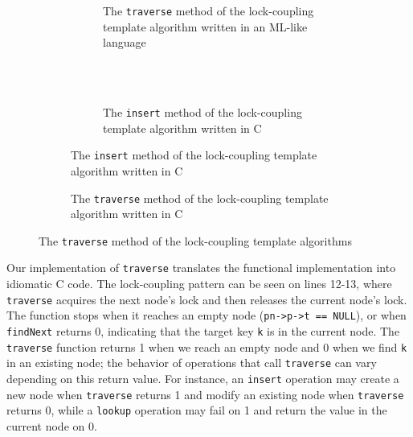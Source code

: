 \documentclass[a4paper,UKenglish,cleveref, autoref, thm-restate]{lipics-v2021}
\newcommand{\wm}[1]{\textbf{\textcolor{violet}{[William: #1]}}}
\begin{document}
\begin{figure}[h]
	\begin{subfigure}[t]{0.48\textwidth}
		\begin{subfigure}[t]{\textwidth}
			 
			\caption{The \lstinline{traverse} method of the lock-coupling template algorithm written in an ML-like language \cite{krishna2019compositional}} 
			\label{traverse_lock_a}	
		\end{subfigure}
		\\ \\ 
		\renewcommand{\thesubfigure}{c}%
		\begin{subfigure}[t]{\textwidth}
			 
			\caption{The \lstinline{insert} method of the lock-coupling template algorithm written in C}
			\label{insert_lock}	
		\end{subfigure}
	\end{subfigure}\qquad
	\renewcommand{\thesubfigure}{b}%
	\begin{subfigure}[t]{0.48\textwidth}
		 
		\caption{The \lstinline{traverse} method of the lock-coupling template algorithm written in C}
		\label{traverse_lock_b}
	\end{subfigure}
	\caption{The \lstinline{traverse} method of the lock-coupling template algorithms 
	}
	\label{traverse_lock}
\end{figure}

Our implementation of \lstinline{traverse} translates the functional implementation into idiomatic C code. The lock-coupling pattern can be seen on lines 12-13, where \lstinline{traverse} acquires the next node's lock and then releases the current node's lock. The function stops when it reaches an empty node (\lstinline{pn->p->t == NULL}), or when \lstinline{findNext} returns 0, indicating that the target key \lstinline{k} is in the current node. The \lstinline{traverse} function returns 1 when we reach an empty node and 0 when we find \lstinline{k} in an existing node; the behavior of operations that call \lstinline{traverse} can vary depending on this return value. For instance, an \lstinline{insert} operation may create a new node when \lstinline{traverse} returns 1 and modify an existing node when \lstinline{traverse} returns 0, while a \lstinline{lookup} operation may fail on 1 and return the value in the current node on 0.
\end{document}
